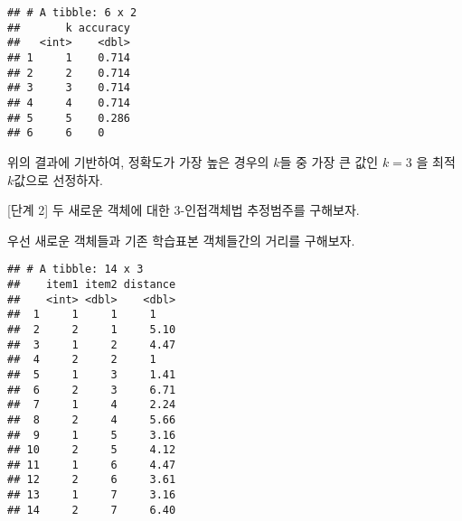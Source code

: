 \documentclass[]{book}
\newenvironment{Shaded}{\begin{snugshade}}{\end{snugshade}}
\newcommand{\DataTypeTok}[1]{\textcolor[rgb]{0.13,0.29,0.53}{#1}}
\newcommand{\DecValTok}[1]{\textcolor[rgb]{0.00,0.00,0.81}{#1}}
\newcommand{\KeywordTok}[1]{\textcolor[rgb]{0.13,0.29,0.53}{\textbf{#1}}}
\newcommand{\NormalTok}[1]{#1}
\newcommand{\OperatorTok}[1]{\textcolor[rgb]{0.81,0.36,0.00}{\textbf{#1}}}
\newcommand{\StringTok}[1]{\textcolor[rgb]{0.31,0.60,0.02}{#1}}
\begin{document}
\begin{verbatim}
## # A tibble: 6 x 2
##       k accuracy
##   <int>    <dbl>
## 1     1    0.714
## 2     2    0.714
## 3     3    0.714
## 4     4    0.714
## 5     5    0.286
## 6     6    0
\end{verbatim}

위의 결과에 기반하여, 정확도가 가장 높은 경우의 \(k\)들 중 가장 큰 값인 \(k = 3\) 을 최적 \(k\)값으로 선정하자.

{[}단계 2{]} 두 새로운 객체에 대한 3-인접객체법 추정범주를 구해보자.

우선 새로운 객체들과 기존 학습표본 객체들간의 거리를 구해보자.

\begin{Shaded}
\end{Shaded}

\begin{verbatim}
## # A tibble: 14 x 3
##    item1 item2 distance
##    <int> <dbl>    <dbl>
##  1     1     1     1   
##  2     2     1     5.10
##  3     1     2     4.47
##  4     2     2     1   
##  5     1     3     1.41
##  6     2     3     6.71
##  7     1     4     2.24
##  8     2     4     5.66
##  9     1     5     3.16
## 10     2     5     4.12
## 11     1     6     4.47
## 12     2     6     3.61
## 13     1     7     3.16
## 14     2     7     6.40
\end{verbatim}
\end{document}
